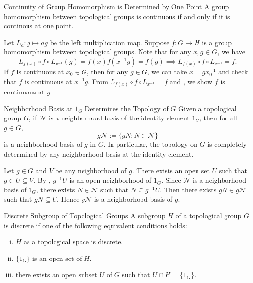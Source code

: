 \documentclass{report}
\begin{document}
\begin{proposition}{Continuity of Group Homomorphism is Determined by One Point}{}
	A group homomorphism between topological groups is continuous if and only if it is continous at one point.
\end{proposition}
\begin{prf}
	Let $L_a: g\mapsto ag$ be the left multiplication map. Suppose $f:G\to H$ is a group homomorphism between topological groups. Note that for any $x,g\in G$, we have 
	\[
	 L_{f(x)}\circ f\circ L_{x^{-1}}(g)=f(x)f(x^{-1}g)=f(g)\implies L_{f(x)}\circ f\circ L_{x^{-1}}=f.
	\]
	If $f$ is continuous at $x_0 \in G$, then for any $g\in G$, we can take $x=gx_0^{-1}$ and check that $f$ is continuous at $x^{-1}g$. From $L_{f(x)}\circ f\circ L_{x^{-1}}=f$ and , we show $f$ is continuous at $g$. 
\end{prf}


\begin{proposition}{Neighborhood Basis at $1_G$ Determines the Topology of $G$}{}
	Given a topological group $G$, if $\mathcal{N}$ is a neighborhood basis of the identity element $1_G$, then for all $g \in G$,
	\[
		g \mathcal{N}:=\{g N: N \in \mathcal{N}\}
	\]
	is a neighborhood basis of $g$ in $G$. In particular, the topology on $G$ is completely determined by any neighborhood basis at the identity element.
\end{proposition}

\begin{prf}
	Let $g\in G$ and $V$ be any neighborhood of $g$. There exists an open set $U$ such that $g\in U\subseteq V$. By , $g^{-1} U$ is an open neighborhood of $1_G$. Since $\mathcal{N}$ is a neighborhood basis of $1_G$, there exists $N \in \mathcal{N}$ such that $N \subseteq g^{-1} U$. Then there exists $g N \in g \mathcal{N}$ such that $g N \subseteq U$. Hence $g \mathcal{N}$ is a neighborhood basis of $g$.
\end{prf}


\begin{definition}{Discrete Subgroup of Topological Groups}
	A subgroup $H$ of a topological group $G$ is {discrete} if one of the following equivalent conditions holds:
	\begin{enumerate}[(i)]
		\item $H$ as a topological space is discrete.
		\item $\{1_G\}$ is an open set of $H$.
		\item there exists an open subset $U$ of $G$ such that $U\cap H=\{1_G\}$.
	\end{enumerate}

\end{definition}
\end{document}
